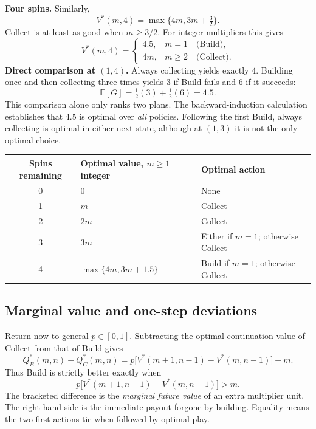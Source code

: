 \documentclass[11pt]{article}
\theoremstyle{remark}\newtheorem{remark}[definition]{Remark}
\newcommand{\E}{\mathbb E}\newcommand{\Prob}{\mathbb P}
\begin{document}
\textbf{Four spins.} Similarly,
\[
V^*(m,4)=\max\{4m,3m+\tfrac32\}.
\]
Collect is at least as good when $m\geq3/2$. For integer multipliers this gives
\[
V^*(m,4)=
\begin{cases}
4.5,&m=1\quad\text{(Build)},\\
4m,&m\geq2\quad\text{(Collect)}.
\end{cases}
\]
\textbf{Direct comparison at $(1,4)$.} Always collecting yields exactly $4$. Building once and then collecting three times yields $3$ if Build fails and $6$ if it succeeds:
\[
\E[G]=\tfrac12(3)+\tfrac12(6)=4.5.
\]
This comparison alone only ranks two plans. The backward-induction calculation establishes that $4.5$ is optimal over \emph{all} policies. Following the first Build, always collecting is optimal in either next state, although at $(1,3)$ it is not the only optimal choice.

\begin{center}
\begin{tabular}{@{}cll@{}}
\toprule
Spins remaining & Optimal value, $m\geq1$ integer & Optimal action\\
\midrule
0 & $0$ & None\\
1 & $m$ & Collect\\
2 & $2m$ & Collect\\
3 & $3m$ & Either if $m=1$; otherwise Collect\\
4 & $\max\{4m,3m+1.5\}$ & Build if $m=1$; otherwise Collect\\
\bottomrule
\end{tabular}
\end{center}

\newpage
\subsection{Marginal value and one-step deviations}
Return now to general $p\in[0,1]$. Subtracting the optimal-continuation value of Collect from that of Build gives
\[
Q_B^*(m,n)-Q_C^*(m,n)
=p\big[V^*(m+1,n-1)-V^*(m,n-1)\big]-m.
\]
Thus Build is strictly better exactly when
\begin{equation}
\boxed{p\big[V^*(m+1,n-1)-V^*(m,n-1)\big]>m.}
\end{equation}
The bracketed difference is the \emph{marginal future value} of an extra multiplier unit. The right-hand side is the immediate payout forgone by building. Equality means the two first actions tie when followed by optimal play.
\end{document}
